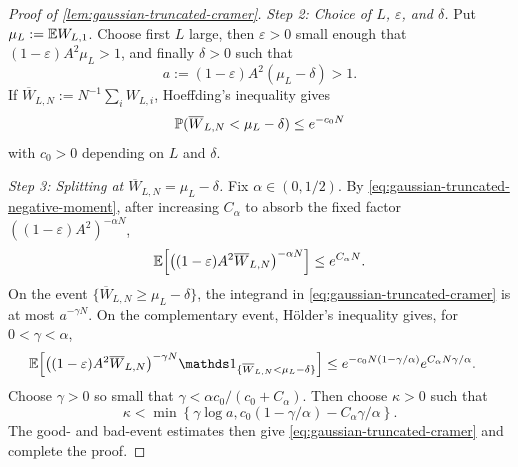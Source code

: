 \documentclass[11pt,reqno,a4paper]{article}
\newcommand{\Pp}{\P}
\newcommand{\Ee}{\E}
\begin{document}
\begin{proof}[Proof of \cref{lem:gaussian-truncated-cramer}]
  \emph{Step 2: Choice of $L$, $\varepsilon$, and $\delta$.}
  Put $\mu_L:=\Ee W_{L,1}$. Choose first $L$ large, then
  $\varepsilon>0$ small enough that $(1-\varepsilon)A^2\mu_L>1$, and finally
  $\delta>0$ such that
  \begin{equation*}
    a:=(1-\varepsilon)A^2(\mu_L-\delta)>1.
  \end{equation*}
  If $\overline W_{L,N}:=N^{-1}\sum_i W_{L,i}$, Hoeffding's inequality gives
  \begin{equation*}
    \Pp(\overline W_{L,N}<\mu_L-\delta)\leq e^{-c_0N}
  \end{equation*}
  with $c_0>0$ depending on $L$ and $\delta$.

  \emph{Step 3: Splitting at
  $\overline W_{L,N}=\mu_L-\delta$.}
  Fix $\alpha\in(0,1/2)$. By
  \cref{eq:gaussian-truncated-negative-moment}, after increasing
  $C_\alpha$ to absorb the fixed factor
  $((1-\varepsilon)A^2)^{-\alpha N}$,
  \begin{equation*}
    \Ee\left[
      \left((1-\varepsilon)A^2\overline W_{L,N}\right)^{-\alpha N}
    \right]
    \leq
    e^{C_\alpha N}.
  \end{equation*}
  On the event $\{\overline W_{L,N}\geq\mu_L-\delta\}$, the integrand in
  \cref{eq:gaussian-truncated-cramer} is at most $a^{-\gamma N}$. On the
  complementary event, H\"older's inequality gives, for $0<\gamma<\alpha$,
  \begin{align*}
    \Ee\left[
      \left((1-\varepsilon)A^2\overline W_{L,N}\right)^{-\gamma N}
      \one_{\{\overline W_{L,N}<\mu_L-\delta\}}
    \right]
    &\leq
    e^{-c_0N(1-\gamma/\alpha)}
    e^{C_\alpha N\gamma/\alpha}.
  \end{align*}
  Choose $\gamma>0$ so small that
  $\gamma < \alpha c_0/(c_0+C_\alpha)$. Then choose $\kappa>0$ such that
  \begin{equation*}
    \kappa < \min\left\{
      \gamma\log a,
      c_0(1-\gamma/\alpha)-C_\alpha\gamma/\alpha
    \right\}.
  \end{equation*}
  The good- and bad-event estimates then give
  \cref{eq:gaussian-truncated-cramer} and complete the proof.
\end{proof}
\end{document}
